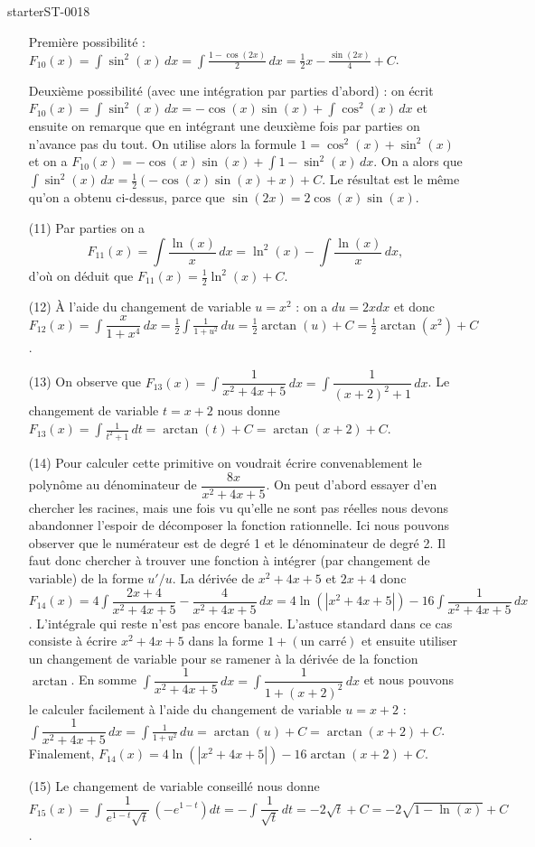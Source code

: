 \begin{corrige}{starterST-0018}
\begin{enumerate}
    Première possibilité : $F_{10}(x)=\displaystyle\int\sin^2 (x)\,dx = \int \frac{1-\cos(2x)}{2} \, dx = \frac{1}{2}x - \frac{\sin(2x)}{4} + C$. 

    Deuxième possibilité (avec une intégration par parties d'abord) : on écrit $F_{10}(x)=\displaystyle\int\sin^2 (x)\,dx = -\cos(x)\sin(x) + \int \cos^2(x) \, dx $ et ensuite on remarque que en intégrant une deuxième fois par parties on n'avance pas du tout. On utilise alors la formule $1 = \cos^2(x) + \sin^2(x)$ et on a  $F_{10}(x)=\displaystyle -\cos(x)\sin(x) + \int 1 - \sin^2(x) \, dx $.   On a alors que $\displaystyle\int\sin^2 (x)\,dx = \frac{1}{2} \left(-\cos(x)\sin(x)  + x\right) + C$. Le résultat est le m\^eme qu'on a obtenu ci-dessus, parce que $\sin(2x) = 2 \cos(x)\sin(x)$.
    \item[(11)]  Par parties on a  
    \[
    F_{11}(x)=\displaystyle\int\dfrac{\ln(x)}{x}\, dx = \ln^2(x) -\int\frac{\ln(x)}{x}\, dx,
    \]
d'où on déduit que $F_{11}(x)=\frac{1}{2} \ln^2(x) +C$.
  \item[(12)] À l'aide du changement de variable $ u = x^2$ : on a $du = 2x  dx$ et donc $F_{12}(x)=\displaystyle\int\dfrac{x}{1+x^4}\, dx = \frac{1}{2}\int \frac{1}{1 + u^2} \, du  = \frac{1}{2} \arctan(u) + C = \frac{1}{2} \arctan(x^2) + C  $. 
  \item[(13)] On observe que $F_{13}(x)=\displaystyle\int\dfrac{1}{x^2+4x+5}\, dx = \int\dfrac{1}{(x+2)^2+1}\, dx$. Le changement de variable $t = x+2$ nous donne  $\displaystyle F_{13}(x)=\int \frac{1}{t^2 + 1}\, dt = \arctan(t) + C = \arctan(x+2) + C$.
  \item[(14)] Pour calculer cette primitive on voudrait écrire convenablement le polyn\^ome au dénominateur de $\displaystyle \dfrac{8x}{x^2+4x+5}$. On peut d'abord essayer d'en chercher les racines, mais une fois vu qu'elle ne sont pas réelles  nous devons abandonner l'espoir de décomposer la fonction rationnelle. Ici nous  pouvons observer que le numérateur est de degré 1 et le dénominateur de degré 2. Il faut donc chercher à trouver une fonction à intégrer (par changement de variable) de la forme $u'/u$. La dérivée de $x^2+4x+5 $ et $2x + 4$ donc $F_{14}(x)=4 \displaystyle\int\dfrac{2x + 4}{x^2+4x+5} - \dfrac{4}{x^2+4x+5}\,dx = 4\ln\left(|x^2+4x+5|\right) -16 \int\dfrac{1}{x^2+4x+5} \, dx $. L'intégrale qui reste n'est pas encore banale. L'astuce standard  dans ce cas consiste à écrire $x^2+4x+5$ dans la forme $1 +(\text{un carré})$ et ensuite utiliser un changement de variable pour se ramener à la dérivée de la fonction $\arctan$. En somme $\displaystyle  \int\dfrac{1}{x^2+4x+5} \, dx  =  \int\dfrac{1}{1 + (x+2)^2} \, dx $ et nous pouvons le calculer facilement à l'aide du changement de variable $ u = x+2$ :  $\displaystyle  \int\dfrac{1}{x^2+4x+5} \, dx = \int \frac{1}{1+u^2} \, du = \arctan(u) + C = \arctan(x+2) + C $. Finalement, $F_{14}(x)=4\ln\left(|x^2+4x+5|\right) -16\arctan(x+2) + C $.
  \item[(15)] Le changement de variable conseillé nous donne $F_{15}(x)=\displaystyle\int \dfrac{1}{e^{1-t}\sqrt{t}}\,(-e^{1-t}) dt = -\int \dfrac{1}{\sqrt{t}}\, dt = -2\sqrt{t} + C = -2\sqrt{1-\ln(x)} + C$.
  


\end{enumerate}
\end{corrige}

